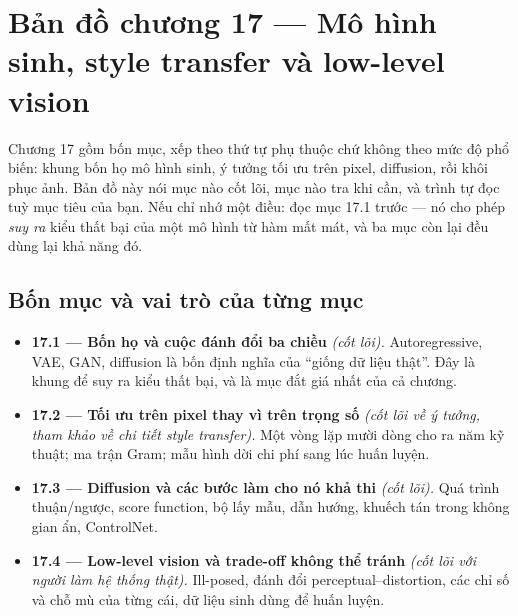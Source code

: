 \documentclass[../../deep_learning.tex]{subfiles}
\begin{document}
\section*{Bản đồ chương 17 --- Mô hình sinh, style transfer và low-level vision}

\begin{tomtat}
Chương 17 gồm bốn mục, xếp theo thứ tự phụ thuộc chứ không theo mức độ phổ biến: khung bốn họ mô hình sinh, ý tưởng tối ưu trên pixel, diffusion, rồi khôi phục ảnh. Bản đồ này nói mục nào cốt lõi, mục nào tra khi cần, và trình tự đọc tuỳ mục tiêu của bạn. Nếu chỉ nhớ một điều: đọc mục 17.1 trước --- nó cho phép \emph{suy ra} kiểu thất bại của một mô hình từ hàm mất mát, và ba mục còn lại đều dùng lại khả năng đó.
\end{tomtat}

\begin{nentang}
\end{nentang}

\subsection*{Bốn mục và vai trò của từng mục}
\begin{itemize}
\item \textbf{17.1 --- Bốn họ và cuộc đánh đổi ba chiều} \emph{(cốt lõi).} Autoregressive, VAE, GAN, diffusion là bốn định nghĩa của ``giống dữ liệu thật''. Đây là khung để suy ra kiểu thất bại, và là mục đắt giá nhất của cả chương.
\item \textbf{17.2 --- Tối ưu trên pixel thay vì trên trọng số} \emph{(cốt lõi về ý tưởng, tham khảo về chi tiết style transfer).} Một vòng lặp mười dòng cho ra năm kỹ thuật; ma trận Gram; mẫu hình dời chi phí sang lúc huấn luyện.
\item \textbf{17.3 --- Diffusion và các bước làm cho nó khả thi} \emph{(cốt lõi).} Quá trình thuận/ngược, score function, bộ lấy mẫu, dẫn hướng, khuếch tán trong không gian ẩn, ControlNet.
\item \textbf{17.4 --- Low-level vision và trade-off không thể tránh} \emph{(cốt lõi với người làm hệ thống thật).} Ill-posed, đánh đổi perceptual--distortion, các chỉ số và chỗ mù của từng cái, dữ liệu sinh dùng để huấn luyện.
\end{itemize}
\end{document}
